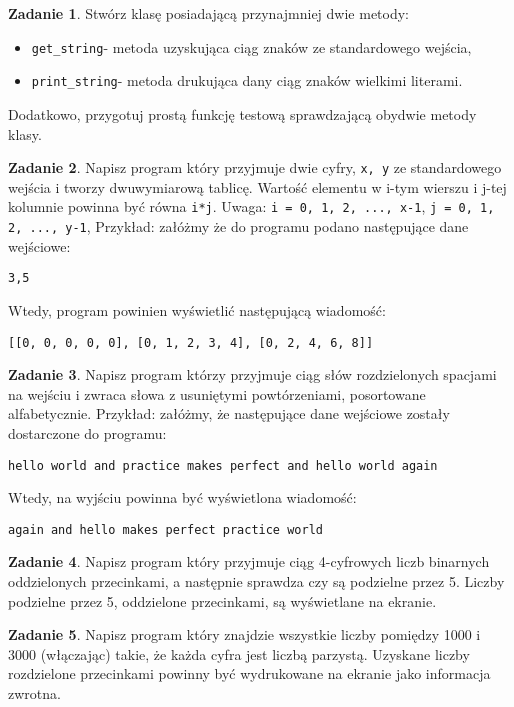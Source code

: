 \documentclass[11pt]{article}
\theoremstyle{definition}
\newtheorem{zadanie}{Zadanie}
\begin{document}
\begin{zadanie}
Stwórz klasę posiadającą przynajmniej dwie metody:
\begin{itemize}
\item\texttt{get\_string}- metoda uzyskująca ciąg znaków ze standardowego wejścia,
\item\texttt{print\_string}- metoda drukująca dany ciąg znaków wielkimi literami.
\end{itemize}
Dodatkowo, przygotuj prostą funkcję testową sprawdzającą obydwie metody klasy.
\end{zadanie}

\begin{zadanie}
Napisz program który przyjmuje dwie cyfry, \texttt{x, y} ze standardowego wejścia i tworzy dwuwymiarową tablicę. Wartość elementu  w i-tym wierszu i j-tej kolumnie powinna być równa \texttt{i*j}. Uwaga: \texttt{i = 0, 1, 2, ..., x-1}, \texttt{j = 0, 1, 2, ..., y-1},
Przykład: załóżmy że do programu podano następujące dane wejściowe:
\begin{verbatim}
3,5
\end{verbatim}
Wtedy, program powinien wyświetlić następującą wiadomość:
\begin{verbatim}
[[0, 0, 0, 0, 0], [0, 1, 2, 3, 4], [0, 2, 4, 6, 8]] 
\end{verbatim}	
\end{zadanie}


\begin{zadanie}
Napisz program którzy przyjmuje ciąg słów rozdzielonych spacjami na wejściu i zwraca słowa z usuniętymi powtórzeniami, posortowane alfabetycznie.
Przykład: załóżmy, że następujące dane wejściowe zostały dostarczone do programu:
\begin{verbatim}
hello world and practice makes perfect and hello world again
\end{verbatim}
Wtedy, na wyjściu powinna być wyświetlona wiadomość:
\begin{verbatim}
again and hello makes perfect practice world
\end{verbatim}
\end{zadanie}

\begin{zadanie}
Napisz program który przyjmuje ciąg 4-cyfrowych liczb binarnych oddzielonych przecinkami, a następnie sprawdza czy są podzielne przez 5. Liczby podzielne przez 5, oddzielone przecinkami, są wyświetlane na ekranie.
\end{zadanie}

\begin{zadanie}
Napisz program który znajdzie wszystkie liczby pomiędzy 1000 i 3000 (włączając) takie, że każda cyfra jest liczbą parzystą. Uzyskane liczby rozdzielone przecinkami powinny być wydrukowane na ekranie jako informacja zwrotna.
\end{zadanie}
\end{document}
